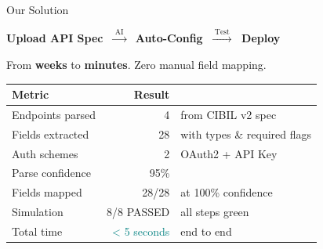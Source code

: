 \documentclass[aspectratio=169,11pt]{beamer}
\begin{document}
\begin{frame}{Our Solution}
\begin{center}
{\Large \textbf{Upload API Spec} $\;\xrightarrow{\;\text{AI}\;}\;$ \textbf{Auto-Config} $\;\xrightarrow{\;\text{Test}\;}\;$ \textbf{Deploy}}
\vspace{0.3em}

{\color{ts} From \textbf{weeks} to \textbf{minutes}. Zero manual field mapping.}
\end{center}

\vspace{0.4em}
\begin{center}
{\small
\begin{tabular}{lrl}
\toprule
\textbf{Metric} & \textbf{Result} & \\
\midrule
Endpoints parsed & \textcolor{ok}{4} & from CIBIL v2 spec \\
Fields extracted & \textcolor{ok}{28} & with types \& required flags \\
Auth schemes & \textcolor{ok}{2} & OAuth2 + API Key \\
Parse confidence & \textcolor{ok}{95\%} & \\
Fields mapped & \textcolor{ok}{28/28} & at 100\% confidence \\
Simulation & \textcolor{ok}{8/8 PASSED} & all steps green \\
Total time & \textcolor{teal}{< 5 seconds} & end to end \\
\bottomrule
\end{tabular}
}
\end{center}
\end{frame}
\end{document}
